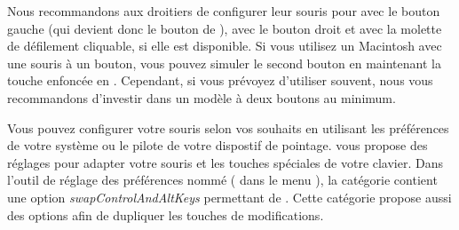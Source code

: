 \documentclass[a4paper,10pt,twoside]{book}
\begin{document}



Nous recommandons aux droitiers de configurer leur souris pour
\click{} avec le bouton gauche
(qui devient donc le bouton de \clickbtn),
\actclick{} avec le bouton droit et \metaclick{} avec la
molette de défilement cliquable, si elle est disponible.
Si vous utilisez un Macintosh avec une souris à un bouton, vous pouvez
simuler le second bouton en maintenant la touche \clover{} enfoncée 
en \clickant. Cependant, si vous prévoyez d'utiliser \pharo souvent, nous
vous recommandons d'investir dans un modèle à deux boutons au minimum.

Vous pouvez configurer votre souris selon vos souhaits en utilisant
les préférences de votre système ou le pilote de votre dispostif de
pointage.
\pharo vous propose des réglages pour adapter votre souris et les
touches spéciales de votre clavier. 
Dans l'outil de réglage des préférences nommé  ( dans le menu ), la catégorie
 contient une option \emph{swapControlAndAltKeys}
permettant de .
Cette catégorie propose aussi des options afin de dupliquer les touches de 
modifications.%
\end{document}
